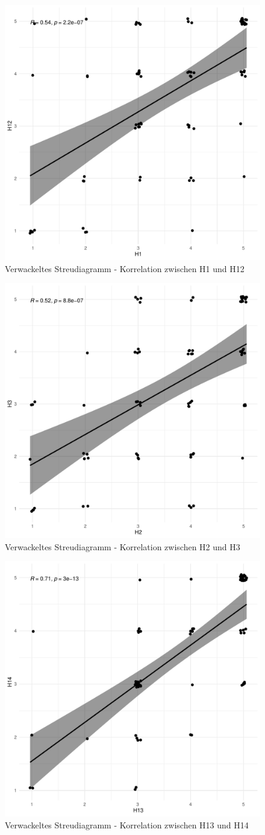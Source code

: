 \begin{figure}[H]
  \centering
  \includegraphics[width=0.65\columnwidth]{figures/plots/h1_h12.pdf}
  \caption{\label{fig:h1-h12} Verwackeltes Streudiagramm - Korrelation zwischen H1 und H12}
\end{figure}

\begin{figure}[H]
  \centering
  \includegraphics[width=0.65\columnwidth]{figures/plots/h2_h3.pdf}
  \caption{\label{fig:h2-h3} Verwackeltes Streudiagramm - Korrelation zwischen H2 und H3}
\end{figure}


\begin{figure}[H]
  \centering
  \includegraphics[width=0.65\columnwidth]{figures/plots/h13_h14.pdf}
  \caption{\label{fig:h13-h14} Verwackeltes Streudiagramm - Korrelation zwischen H13 und H14}
\end{figure}